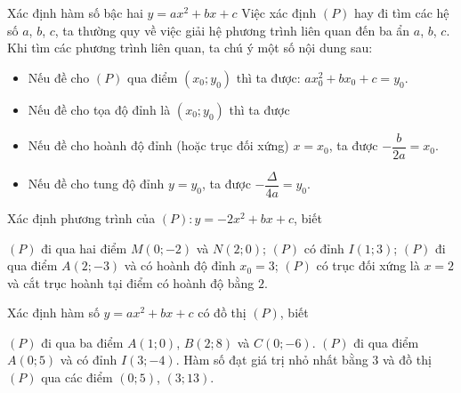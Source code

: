 \begin{dang}{Xác định hàm số bậc hai $y=ax^2+bx+c$}
	Việc xác định $(P)$ hay đi tìm các hệ số $a$, $b$, $c$, ta thường quy về việc giải hệ phương trình liên quan đến ba ẩn  $a$, $b$, $c$. Khi tìm các phương trình liên quan, ta chú ý một số nội dung sau:
	\begin{itemize}
		\item[\iconMT] Nếu đề cho $(P)$ qua điểm $(x_0;y_0)$ thì ta được: $ax_0^2+bx_0+c=y_0$.
		\item[\iconMT] Nếu đề cho tọa độ đỉnh là $(x_0;y_0)$ thì ta được
		\item[\iconMT] Nếu đề cho hoành độ đỉnh (hoặc trục đối xứng) $x=x_0$, ta được $-\dfrac{b}{2a}=x_0$.
		\item[\iconMT] Nếu đề cho tung độ đỉnh $y=y_0$, ta được $-\dfrac{\Delta}{4a}=y_0$.
	\end{itemize}
\end{dang}
\begin{vd}
	Xác định phương trình của $(P)\colon y=-2x^2+bx+c$, biết
	\begin{tasks}
		\task $(P)$ đi qua hai điểm $M(0;-2)$ và $N(2;0)$;
		\task $(P)$ có đỉnh $I(1;3)$;
		\task $(P)$ đi qua điểm $A(2;-3)$ và có hoành độ đỉnh $x_0=3$;
		\task $(P)$ có trục đối xứng là $x=2$ và cắt trục hoành tại điểm có hoành độ bằng $2$.
	\end{tasks}
	\loigiai{}
\end{vd}

\begin{vd}
	Xác định hàm số $y=ax^2+bx+c$ có đồ thị $(P)$, biết 
	\begin{tasks}
		\task $(P)$ đi qua ba điểm $A(1;0)$, $B(2;8)$ và $C(0;-6)$.
		\task $(P)$ đi qua điểm $A(0;5)$ và có đỉnh $I(3;-4)$.
		\task Hàm số đạt giá trị nhỏ nhất bằng $3$ và đồ thị $(P)$ qua các điểm $(0;5)$, $(3;13)$.
	\end{tasks}
	\loigiai{}
\end{vd}

